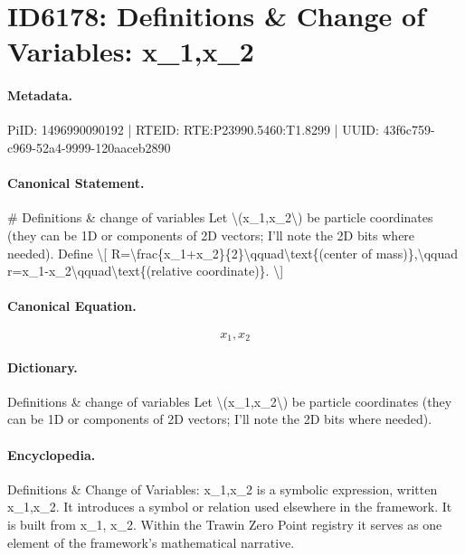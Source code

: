 \section*{ID6178: Definitions \& Change of Variables: x\_1,x\_2}
\paragraph{Metadata.}
PiID: 1496990090192 | RTEID: RTE:P23990.5460:T1.8299 | UUID: 43f6c759-c969-52a4-9999-120aaceb2890

\paragraph{Canonical Statement.}
\# Definitions \& change of variables Let \textbackslash{}(x\_1,x\_2\textbackslash{}) be particle coordinates (they can be 1D or components of 2D vectors; I’ll note the 2D bits where needed). Define \textbackslash{}[ R=\textbackslash{}frac\{x\_1+x\_2\}\{2\}\textbackslash{}qquad\textbackslash{}text\{(center of mass)\},\textbackslash{}qquad r=x\_1-x\_2\textbackslash{}qquad\textbackslash{}text\{(relative coordinate)\}. \textbackslash{}]

\paragraph{Canonical Equation.}
\[
x_1,x_2
\]

\paragraph{Dictionary.}
Definitions \& change of variables Let \textbackslash{}(x\_1,x\_2\textbackslash{}) be particle coordinates (they can be 1D or components of 2D vectors; I’ll note the 2D bits where needed).

\paragraph{Encyclopedia.}
Definitions \& Change of Variables: x\_1,x\_2 is a symbolic expression, written x\_1,x\_2. It introduces a symbol or relation used elsewhere in the framework. It is built from x\_1, x\_2. Within the Trawin Zero Point registry it serves as one element of the framework's mathematical narrative.
